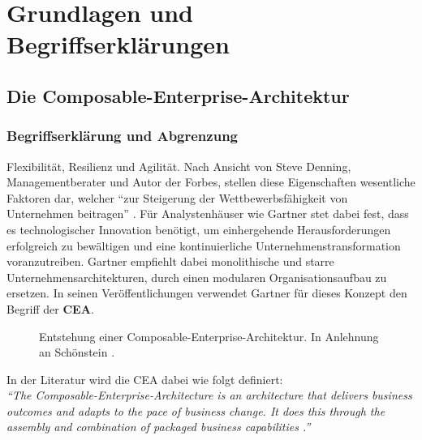 \section{Grundlagen und Begriffserklärungen}

\subsection{Die Composable-Enterprise-Architektur}

\subsubsection{Begriffserklärung und Abgrenzung}
\label{sec:CEA_B}
Flexibilität, Resilienz und Agilität. Nach Ansicht von Steve Denning, Managementberater und Autor der Forbes, stellen diese Eigenschaften wesentliche Faktoren dar, welcher \enquote{zur Steigerung der Wettbewerbsfähigkeit von Unternehmen beitragen} \cite{Denning.20170210}. Für Analystenhäuser wie Gartner stet dabei fest, dass es technologischer Innovation benötigt, um einhergehende Herausforderungen erfolgreich zu bewältigen und eine kontinuierliche Unternehmenstransformation voranzutreiben. Gartner empfiehlt dabei monolithische und starre Unternehmensarchitekturen, durch einen modularen Organisationsaufbau zu ersetzen. In seinen Veröffentlichungen verwendet Gartner für dieses Konzept den Begriff der \textbf{\ac{CEA}}.
\begin{center}
	\begin{figure}[H]
		\centering
		\caption[Entstehung einer Composable-Enterprise-Architektur]{Entstehung einer Composable-Enterprise-Architektur. In Anlehnung an Schönstein \cite{Schonenstein.20230103}.}
		\label{fig:CEA_S}
	\end{figure}	
\end{center}
\vspace*{-15mm}
In der Literatur wird die CEA dabei wie folgt definiert:\vspace{2mm}\\
\textit{\enquote{The Composable-Enterprise-Architecture is an architecture that delivers business outcomes and adapts to the pace of business change. It does this through the assembly and combination of packaged business capabilities \cite{.20230313}.}}\vspace{2mm}\\
